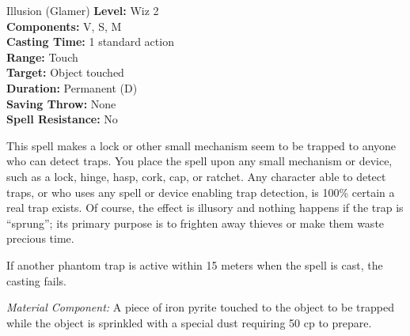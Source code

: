 {Illusion (Glamer)}
{
	\textbf{Level:}
	Wiz 2\\
	\textbf{Components:}
	V, S, M\\
	\textbf{Casting Time:}
	1 standard action\\
	\textbf{Range:}
	Touch\\
	\textbf{Target:}
	Object touched\\
	\textbf{Duration:}
	Permanent (D)\\
	\textbf{Saving Throw:}
	None\\
	\textbf{Spell Resistance:}
	No\\
}
{
	This spell makes a lock or other small mechanism seem to be trapped to anyone who can detect traps. You place the spell upon any small mechanism or device, such as a lock, hinge, hasp, cork, cap, or ratchet. Any character able to detect traps, or who uses any spell or device enabling trap detection, is 100\% certain a real trap exists. Of course, the effect is illusory and nothing happens if the trap is ``sprung''; its primary purpose is to frighten away thieves or make them waste precious time.

	If another phantom trap is active within 15 meters when the spell is cast, the casting fails.

	\textit{Material Component:}
	A piece of iron pyrite touched to the object to be trapped while the object is sprinkled with a special dust requiring 50 cp to prepare.

}
